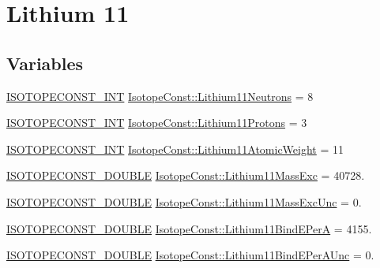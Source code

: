 \hypertarget{group___isotope_const-_lithium-_li11}{}\section{Lithium 11}
\label{group___isotope_const-_lithium-_li11}
\subsection*{Variables}
\begin{DoxyCompactItemize}
\item 
\mbox{\hyperlink{group___isotope_const-_macros_ga5f18360b3e99483a35c32d789e62621c}{I\+S\+O\+T\+O\+P\+E\+C\+O\+N\+S\+T\+\_\+\+I\+NT}} \mbox{\hyperlink{group___isotope_const-_lithium-_li11_ga5b7445c47121b19b00190fa4225ed77f}{Isotope\+Const\+::\+Lithium11\+Neutrons}} = 8
\item 
\mbox{\hyperlink{group___isotope_const-_macros_ga5f18360b3e99483a35c32d789e62621c}{I\+S\+O\+T\+O\+P\+E\+C\+O\+N\+S\+T\+\_\+\+I\+NT}} \mbox{\hyperlink{group___isotope_const-_lithium-_li11_ga949e96552859e7568b695a0164d59a6e}{Isotope\+Const\+::\+Lithium11\+Protons}} = 3
\item 
\mbox{\hyperlink{group___isotope_const-_macros_ga5f18360b3e99483a35c32d789e62621c}{I\+S\+O\+T\+O\+P\+E\+C\+O\+N\+S\+T\+\_\+\+I\+NT}} \mbox{\hyperlink{group___isotope_const-_lithium-_li11_ga61425e8fa2bcbfc9fa084b0af93f2292}{Isotope\+Const\+::\+Lithium11\+Atomic\+Weight}} = 11
\item 
\mbox{\hyperlink{group___isotope_const-_macros_ga8f45a7272ce02c0b4c65c44636ed719a}{I\+S\+O\+T\+O\+P\+E\+C\+O\+N\+S\+T\+\_\+\+D\+O\+U\+B\+LE}} \mbox{\hyperlink{group___isotope_const-_lithium-_li11_gac8ba52def7268a5abc58ea555c64268b}{Isotope\+Const\+::\+Lithium11\+Mass\+Exc}} = 40728.
\item 
\mbox{\hyperlink{group___isotope_const-_macros_ga8f45a7272ce02c0b4c65c44636ed719a}{I\+S\+O\+T\+O\+P\+E\+C\+O\+N\+S\+T\+\_\+\+D\+O\+U\+B\+LE}} \mbox{\hyperlink{group___isotope_const-_lithium-_li11_ga6f424647e9d11db80a18f287805198c1}{Isotope\+Const\+::\+Lithium11\+Mass\+Exc\+Unc}} = 0.
\item 
\mbox{\hyperlink{group___isotope_const-_macros_ga8f45a7272ce02c0b4c65c44636ed719a}{I\+S\+O\+T\+O\+P\+E\+C\+O\+N\+S\+T\+\_\+\+D\+O\+U\+B\+LE}} \mbox{\hyperlink{group___isotope_const-_lithium-_li11_ga28d3bdd72ca74a937fcd8b4fbae77513}{Isotope\+Const\+::\+Lithium11\+Bind\+E\+PerA}} = 4155.
\item 
\mbox{\hyperlink{group___isotope_const-_macros_ga8f45a7272ce02c0b4c65c44636ed719a}{I\+S\+O\+T\+O\+P\+E\+C\+O\+N\+S\+T\+\_\+\+D\+O\+U\+B\+LE}} \mbox{\hyperlink{group___isotope_const-_lithium-_li11_ga1afd4962d393b4c3c163eb74a4f71179}{Isotope\+Const\+::\+Lithium11\+Bind\+E\+Per\+A\+Unc}} = 0.

\end{DoxyCompactItemize}
